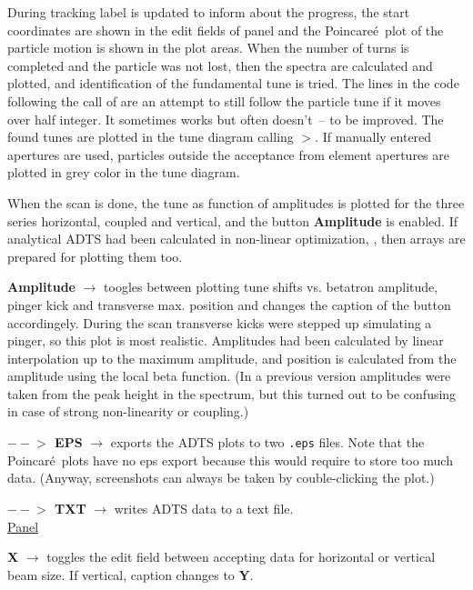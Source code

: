 \documentclass[12pt]{article}
\newcommand\code[1]{{\tt #1}}
\newcommand{\ofld}[1]{\colorbox{black!15}{{\bf #1}}}
\newcommand\guico[1]{{\color{blue}\code{#1}}}
\newcommand{\unico}[1]{{\color{burntorange}\code{#1}}}
\newcommand{\evcod}[2]{\ofld{#1} $\rightarrow$ \guico{#2}}
\newcommand{\grcod}[2]{\opagui{#1}$>$\guico{#2}}
\newcommand{\opagui}[1]{\colorbox{blue!20}{{\color{black}\code{#1}}}}
\newcommand{\ogui}[1]{\hyperref[#1]{\opagui{#1}}}
\newcommand{\todo}[1]{{\color{red} #1}}
\begin{document}
During tracking label \guico{labtprog} is updated to inform about the progress, the start coordinates are shown in the edit fields of panel \guico{PanCtrl} and the Poincare\'e\ plot of the particle motion is shown in the \guico{psx,psy} plot areas. When the number of turns is completed and the particle was not lost, then the spectra are calculated and plotted, and identification of the fundamental tune is tried. \todo{The lines in the code following the call of \unico{Spectrum} are an attempt to still follow the particle tune if it moves over half integer. It sometimes works but often doesn't~-- to be improved.} The found tunes are plotted in the tune diagram calling \grcod{opatunediag}{AddTushPoint}. If manually entered apertures are used, particles outside the acceptance from element apertures are plotted in grey color in the tune diagram.

When the scan is done, the tune as function of amplitudes is plotted for the three series horizontal, coupled and vertical, and the button \ofld{Amplitude} is enabled. If analytical ADTS had been calculated in non-linear optimization, \ogui{opachroma}, then arrays are prepared for plotting them too.

\evcod{Amplitude}{TSplotButClick} toogles between plotting tune shifts vs. betatron amplitude, pinger kick and transverse max. position and changes the caption of the button accordingely. During the scan transverse kicks were stepped up simulating a pinger, so this plot is most realistic. Amplitudes had been calculated by linear interpolation up to the maximum amplitude, and position is calculated from the amplitude using the local beta function. (In a previous version amplitudes were taken from the peak height in the spectrum, but this turned out to be confusing in case of strong non-linearity or coupling.)

\evcod{$--\!\!>$ EPS}{butExportClick} exports the ADTS plots to two \code{.eps} files. Note that the Poincar\'e\ plots have no eps export because this would require to store too much data. (Anyway, screenshots can always be taken by couble-clicking the plot.)

\evcod{$--\!\!>$ TXT}{butTXTClick}  writes ADTS data to a text file.\\[1ex]

\underline{Panel \guico{PanBeam}}

\evcod{X}{ButBeamXYClick} toggles the edit field between accepting data for horizontal or vertical beam size. If vertical, caption changes to \ofld{Y}. 
\end{document}
